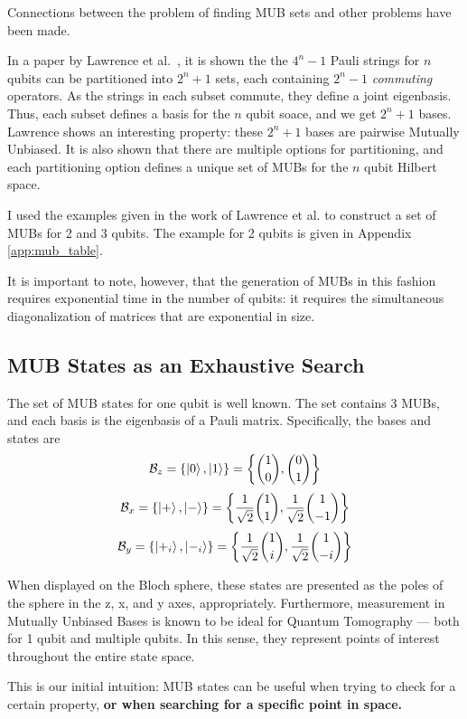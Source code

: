 \documentclass[a4paper,12pt]{article}
\newcommand{\base}{\mathcal{B}}
\newcommand{\dvect}[2]{{#1 \choose #2}}
\begin{document}
Connections between the problem of finding MUB sets and other problems have been made.

In a paper by Lawrence et al.~\cite{lawrence_mutually_2002}, it is shown the the $4^n-1$ Pauli strings for $n$ qubits can be partitioned into $2^n+1$ sets, each containing $2^n-1$ \emph{commuting} operators.
As the strings in each subset commute, they define a joint eigenbasis.
Thus, each subset defines a basis for the $n$ qubit soace, and we get $2^n+1$ bases.
Lawrence shows an interesting property: these $2^n+1$ bases are pairwise Mutually Unbiased.
It is also shown that there are multiple options for partitioning, and each partitioning option defines a unique set of MUBs for the $n$ qubit Hilbert space.


I used the examples given in the work of Lawrence et al. to construct a set of MUBs for 2 and 3 qubits. The example for 2 qubits is given in Appendix \ref{app:mub_table}.

It is important to note, however, that the generation of MUBs in this fashion requires exponential time in the number of qubits: it requires the simultaneous diagonalization of matrices that are exponential in size.

\subsection{MUB States as an Exhaustive Search}

The set of MUB states for one qubit is well known. The set contains 3 MUBs, and each basis is the eigenbasis of a Pauli matrix.
Specifically, the bases and states are
$$ \base_z = \{ \ket{0}, \ket{1}\}  = \biggl\{\dvect{1}{0}, \dvect{0}{1}\biggr\}$$
$$ \base_x = \{ \ket{+}, \ket{-}\}  = \biggl\{\frac{1}{\sqrt{2}}\dvect{1}{1}, \frac{1}{\sqrt{2}}\dvect{1}{-1}\biggr\}$$
$$ \base_y = \{ \ket{+_i}, \ket{-_i}\}  = \biggl\{\frac{1}{\sqrt{2}}\dvect{1}{i}, \frac{1}{\sqrt{2}}\dvect{1}{-i}\biggr\}$$

When displayed on the Bloch sphere, these states are presented as the poles of the sphere in the z, x, and y axes, appropriately. Furthermore, measurement in Mutually Unbiased Bases is known to be ideal for Quantum Tomography --- both for 1 qubit and multiple qubits. In this sense, they represent points of interest throughout the entire state space.

This is our initial intuition: MUB states can be useful when trying to check for a certain property, \textbf{or when searching for a specific point in space.}
\end{document}
